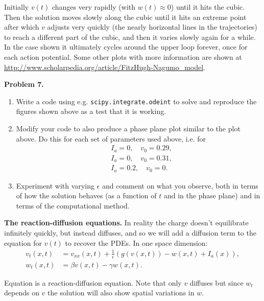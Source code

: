 \documentclass[10pt]{article}
\begin{document}
Initially $v(t)$ changes very rapidly (with $w(t)\approx 0$) until it
hits the cubic. Then
the solution moves slowly along the cubic until it hits an extreme point 
after which $v$ adjusts very quickly (the nearly horizontal lines in the
trajectories) to reach a different part of the cubic, and then it varies
slowly again for a while. In the case shown it ultimately cycles around
the upper loop forever, once for each action potential.
Some other plots with more information are
shown at \url{http://www.scholarpedia.org/article/FitzHugh-Nagumo_model}.



\vskip 10pt
{\large\bf Problem 7.} 
\vskip 10pt
\begin{enumerate} 
\item Write a code using e.g. {\tt scipy.integrate.odeint} to solve
 and reproduce the figures shown above as a test that it is working.  


\item Modify your code to also produce a phase plane plot similar to the plot
above.  Do this for each set of parameters used above, i.e. for
\[
\begin{split}
&I_a = 0, \quad v_0 = 0.29,\\
&I_a = 0, \quad v_0 = 0.31,\\
&I_a = 0.2, \quad v_0 = 0.
\end{split} 
\]

\item Experiment with varying $\epsilon$ and comment on what you observe,
both in terms of how the solution behaves (as a function of $t$ and in the
phase plane) and in terms of the computational method.
\end{enumerate} 

\vskip 10pt

{\bf The reaction-diffusion equations.}
In reality the charge doesn't
equilibrate infinitely quickly, but instead diffuses, and so we will add a
diffusion term to the equation for $v(t)$ to recover the PDEs.
In one space dimension:
\begin{equation}\label{FHN1d}
\begin{split}
v_t(x,t) &= v_{xx}(x,t) + \frac 1 \epsilon (g(v(x,t)) - w(x,t) + I_a(x)),\\
w_t(x,t) &= \beta v(x,t) - \gamma w(x,t).
\end{split}
\end{equation} 

Equation  is a reaction-diffusion equation.  Note that only $v$
diffuses but since $w_t$ depends on $v$ the solution will also show spatial
variations in $w$.
\end{document}

